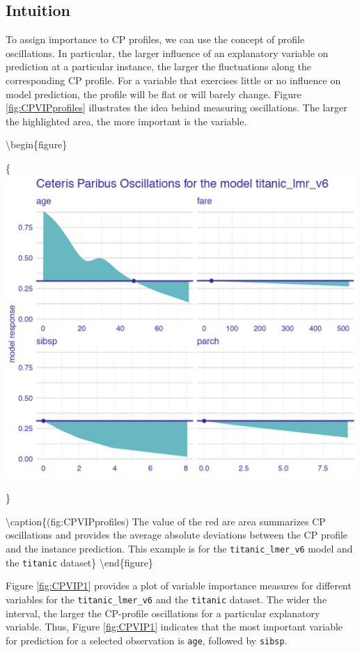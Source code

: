 \documentclass[12pt,]{krantz}
\theoremstyle{definition}
\theoremstyle{definition}
\theoremstyle{definition}
\theoremstyle{remark}
\begin{document}
\hypertarget{intuition-1}{%
\subsection{Intuition}\label{intuition-1}}

To assign importance to CP profiles, we can use the concept of profile
oscillations. In particular, the larger influence of an explanatory
variable on prediction at a particular instance, the larger the
fluctuations along the corresponding CP profile. For a variable that
exercises little or no influence on model prediction, the profile will
be flat or will barely change. Figure \ref{fig:CPVIPprofiles}
illustrates the idea behind measuring oscillations. The larger the
highlighted area, the more important is the variable.

\textbackslash{}begin\{figure\}

\{\centering \includegraphics[width=0.7\linewidth]{figure/oscillations_all_lmr}

\}

\textbackslash{}caption\{(fig:CPVIPprofiles) The value of the red are
area summarizes CP oscillations and provides the average absolute
deviations between the CP profile and the instance prediction. This
example is for the \texttt{titanic\_lmer\_v6} model and the
\texttt{titanic} dataset\}\label{fig:CPVIPprofiles}
\textbackslash{}end\{figure\}

Figure \ref{fig:CPVIP1} provides a plot of variable importance measures
for different variables for the \texttt{titanic\_lmer\_v6} and the
\texttt{titanic} dataset. The wider the interval, the larger the
CP-profile oscillations for a particular explanatory variable. Thus,
Figure \ref{fig:CPVIP1} indicates that the most important variable for
prediction for a selected observation is \texttt{age}, followed by
\texttt{sibsp}.
\end{document}
